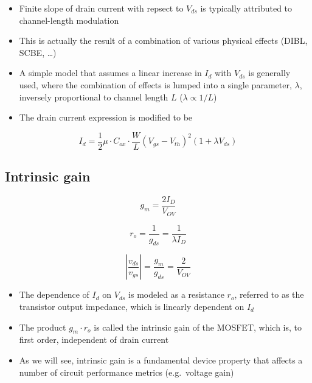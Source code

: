 \documentclass[11pt]{article}
\providecommand{\tightlist}{%
      \setlength{\itemsep}{0pt}\setlength{\parskip}{0pt}}
\begin{document}
    \begin{itemize}
\tightlist
\item
  Finite slope of drain current with repsect to \(V_{ds}\) is typically
  attributed to channel-length modulation
\item
  This is actually the result of a combination of various physical
  effects (DIBL, SCBE, \ldots)
\item
  A simple model that assumes a linear increase in \(I_d\) with
  \(V_{ds}\) is generally used, where the combination of effects is
  lumped into a single parameter, \(\lambda\), inversely proportional to
  channel length \(L\) (\(\lambda \propto 1/L\))
\item
  The drain current expression is modified to be
\end{itemize}

\begin{equation}
\boxed{I_d = \dfrac{1}{2}\mu\cdot C_{ox} \cdot \dfrac{W}{L}(V_{gs}-V_{th})^2 (1+\lambda V_{ds})}
\end{equation}

    \hypertarget{intrinsic-gain}{%
\subsection{Intrinsic gain}\label{intrinsic-gain}}

    

    \begin{equation}
g_m = \dfrac{2I_D}{V_{OV}}
\end{equation}

\begin{equation}
r_o = \dfrac{1}{g_{ds}} = \dfrac{1}{\lambda I_D}
\end{equation}

\begin{equation}
\left|\dfrac{v_{ds}}{v_{gs}}\right| = \dfrac{g_m}{g_{ds}} = \dfrac{2}{V_{OV}}
\end{equation}

    \begin{itemize}
\tightlist
\item
  The dependence of \(I_d\) on \(V_{ds}\) is modeled as a resistance
  \(r_o\), referred to as the transistor output impedance, which is
  linearly dependent on \(I_d\)
\item
  The product \(g_m \cdot r_o\) is called the intrinsic gain of the
  MOSFET, which is, to first order, independent of drain current
\item
  As we will see, intrinsic gain is a fundamental device property that
  affects a number of circuit performance metrics (e.g.~voltage gain)
\end{itemize}
\end{document}
